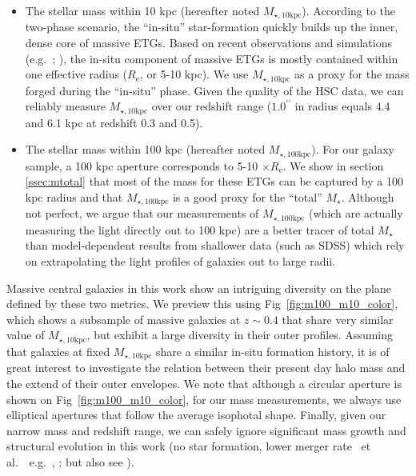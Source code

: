 \documentclass[a4paper,fleqn,usenatbib]{mnras}
\def\arcsec{{\prime\prime}}
\def\etal{{\ et al.~}}
\def\mstar{{$M_{\star}$}}
\def\minn{{$M_{\star,10\mathrm{kpc}}$}}
\def\mtot{{$M_{\star,100\mathrm{kpc}}$}}
\begin{document}
    \begin{itemize}
    
        \item The stellar mass within 10 kpc (hereafter noted \minn{}). 
            According to the two-phase scenario, the ``in-situ'' star-formation quickly 
            builds up the inner, dense core of massive ETGs.  
            Based on recent observations and simulations (e.g.~\citealt{vanDokkum2010}; 
            \citealt{RodriguezGomez2016}), the in-situ component of massive ETGs is 
            mostly contained within one effective radius ($R_{\mathrm{e}}$, or 5-10 kpc). 
            We use \minn{} as a proxy for the mass forged during the ``in-situ''
            phase. 
            Given the quality of the HSC data, we can reliably measure \minn{} over our 
            redshift range ($1.0^{\arcsec}$ in radius equals 4.4 and 6.1 kpc at redshift
            0.3 and 0.5).  
            
        \item The stellar mass within 100 kpc (hereafter noted \mtot{}). 
            For our galaxy sample, a 100 kpc aperture corresponds to 5-10 
            $\times R_{\mathrm{e}}$. 
            We show in section \ref{ssec:mtotal} that most of the mass for these ETGs 
            can be captured by a 100 kpc radius and that \mtot{} is a good proxy for the 
            ``total'' \mstar{}. 
            Although not perfect, we argue that our measurements of \mtot{} (which are 
            actually measuring the light directly out to 100 kpc) are a better tracer 
            of total \mstar{} than model-dependent results from shallower data 
            (such as SDSS) which rely on extrapolating the light profiles of galaxies 
            out to large radii.
            
       \end{itemize}
    
    Massive central galaxies in this work show an intriguing diversity on the plane 
    defined by these two metrics.  
    We preview this using Fig~\ref{fig:m100_m10_color}, which shows a subsample of 
    massive galaxies at $z\sim 0.4$ that share very similar value of \minn{}, but 
    exhibit a large diversity in their outer profiles. 
    Assuming that galaxies at fixed \minn{} share a similar in-situ formation history, 
    it is of great interest to investigate the relation between their present day halo 
    mass and the extend of their outer envelopes. 
    We note that although a circular aperture is shown on Fig~\ref{fig:m100_m10_color}, 
    for our mass measurements, we always use elliptical apertures that follow the 
    average isophotal shape. Finally, given our narrow mass and redshift range, we 
    can safely ignore significant mass growth and structural evolution in this work
    (no star formation, lower merger rate \etal~e.g.\ \citealt{Bellstedt2016},
    \citealt{Inagaki2015}; but also see \citealt{Bai2014}). 
\end{document}

